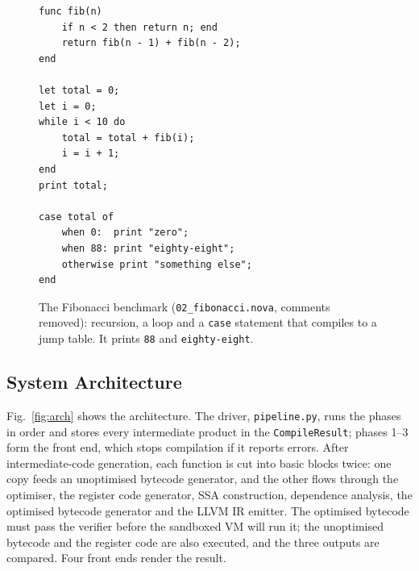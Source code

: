 \documentclass[conference]{IEEEtran}
\newcommand{\code}[1]{\texttt{#1}}
\begin{document}
\begin{figure}[!tbp]
\begin{lstlisting}
func fib(n)
    if n < 2 then return n; end
    return fib(n - 1) + fib(n - 2);
end

let total = 0;
let i = 0;
while i < 10 do
    total = total + fib(i);
    i = i + 1;
end
print total;

case total of
    when 0:  print "zero";
    when 88: print "eighty-eight";
    otherwise print "something else";
end
\end{lstlisting}
\caption{The Fibonacci benchmark (\code{02\_fibonacci.nova}, comments removed): recursion, a loop and a \code{case} statement that compiles to a jump table. It prints \code{88} and \code{eighty-eight}.}
\label{fig:listing}
\end{figure}

\subsection{System Architecture}
Fig.~\ref{fig:arch} shows the architecture. The driver, \code{pipeline.py}, runs the phases in order and stores every intermediate product in the \code{CompileResult}; phases 1--3 form the front end, which stops compilation if it reports errors. After intermediate-code generation, each function is cut into basic blocks twice: one copy feeds an unoptimised bytecode generator, and the other flows through the optimiser, the register code generator, SSA construction, dependence analysis, the optimised bytecode generator and the LLVM IR emitter. The optimised bytecode must pass the verifier before the sandboxed VM will run it; the unoptimised bytecode and the register code are also executed, and the three outputs are compared. Four front ends render the result.
\end{document}
